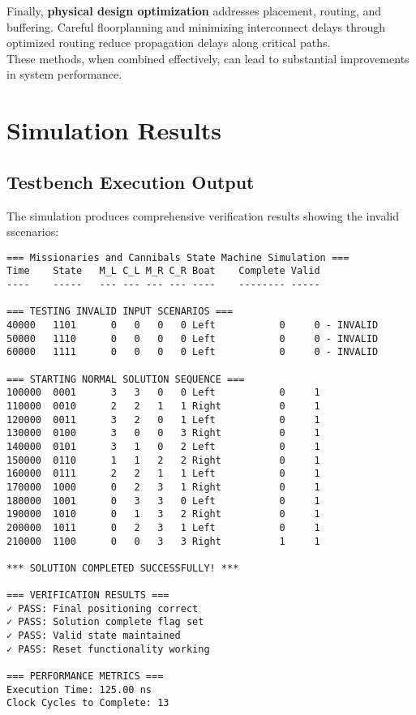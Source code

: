 \documentclass[10pt,a4paper]{article}
\begin{document}
\noindent Finally, \textbf{physical design optimization} addresses placement, routing, and buffering. Careful floorplanning and minimizing interconnect delays through optimized routing reduce propagation delays along critical paths.\\

\noindent These methods, when combined effectively, can lead to substantial improvements in system performance.

\section*{Simulation Results}

\subsection*{Testbench Execution Output}

\noindent The simulation produces comprehensive verification results showing the invalid sscenarios:

\begin{verbatim}
=== Missionaries and Cannibals State Machine Simulation ===
Time    State   M_L C_L M_R C_R Boat    Complete Valid
----    -----   --- --- --- --- ----    -------- -----

=== TESTING INVALID INPUT SCENARIOS ===
40000   1101      0   0   0   0 Left           0     0 - INVALID
50000   1110      0   0   0   0 Left           0     0 - INVALID
60000   1111      0   0   0   0 Left           0     0 - INVALID

=== STARTING NORMAL SOLUTION SEQUENCE ===
100000  0001      3   3   0   0 Left           0     1
110000  0010      2   2   1   1 Right          0     1
120000  0011      3   2   0   1 Left           0     1
130000  0100      3   0   0   3 Right          0     1
140000  0101      3   1   0   2 Left           0     1
150000  0110      1   1   2   2 Right          0     1
160000  0111      2   2   1   1 Left           0     1
170000  1000      0   2   3   1 Right          0     1
180000  1001      0   3   3   0 Left           0     1
190000  1010      0   1   3   2 Right          0     1
200000  1011      0   2   3   1 Left           0     1
210000  1100      0   0   3   3 Right          1     1

*** SOLUTION COMPLETED SUCCESSFULLY! ***

=== VERIFICATION RESULTS ===
✓ PASS: Final positioning correct
✓ PASS: Solution complete flag set
✓ PASS: Valid state maintained
✓ PASS: Reset functionality working

=== PERFORMANCE METRICS ===
Execution Time: 125.00 ns
Clock Cycles to Complete: 13
\end{verbatim}
\end{document}
